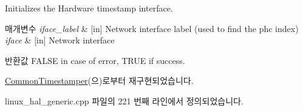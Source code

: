 Initializes the Hardware timestamp interface. 


\begin{DoxyParams}{매개변수}
{\em iface\+\_\+label} & \mbox{[}in\mbox{]} Network interface label (used to find the phc index) \\
\hline
{\em iface} & \mbox{[}in\mbox{]} Network interface \\
\hline
\end{DoxyParams}
\begin{DoxyReturn}{반환값}
F\+A\+L\+SE in case of error, T\+R\+UE if success. 
\end{DoxyReturn}


\hyperlink{class_common_timestamper_abde0de8253fd960807f7f2816c0c5225}{Common\+Timestamper}(으)로부터 재구현되었습니다.



linux\+\_\+hal\+\_\+generic.\+cpp 파일의 221 번째 라인에서 정의되었습니다.


